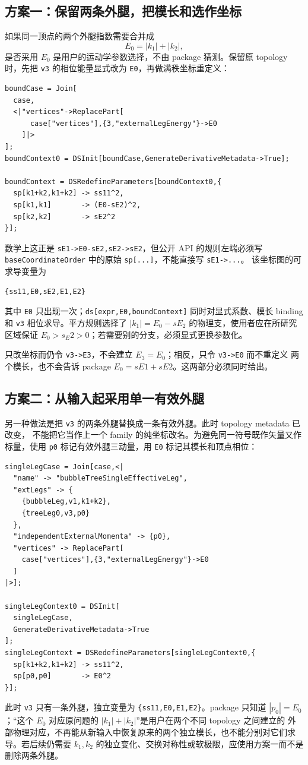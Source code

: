 ﻿\documentclass[a4paper,11pt]{article}
\begin{document}
\subsection{方案一：保留两条外腿，把模长和选作坐标}

如果同一顶点的两个外腿指数需要合并成
\begin{equation}
 E_0=|k_1|+|k_2|,
\end{equation}
是否采用 $E_0$ 是用户的运动学参数选择，不由 package 猜测。保留原 topology 时，先把
\texttt{v3} 的相位能量显式改为 \texttt{E0}，再做满秩坐标重定义：
\begin{verbatim}
boundCase = Join[
  case,
  <|"vertices"->ReplacePart[
      case["vertices"],{3,"externalLegEnergy"}->E0
    ]|>
];
boundContext0 = DSInit[boundCase,GenerateDerivativeMetadata->True];

boundContext = DSRedefineParameters[boundContext0,{
  sp[k1+k2,k1+k2] -> ss11^2,
  sp[k1,k1]       -> (E0-sE2)^2,
  sp[k2,k2]       -> sE2^2
}];
\end{verbatim}
数学上这正是 \texttt{sE1->E0-sE2,sE2->sE2}，但公开 API 的规则左端必须写
\texttt{baseCoordinateOrder} 中的原始 \texttt{sp[...]}，不能直接写 \texttt{sE1->...}。
该坐标图的可求导变量为
\begin{verbatim}
{ss11,E0,sE2,E1,E2}
\end{verbatim}
其中 \texttt{E0} 只出现一次；\texttt{ds[expr,E0,boundContext]} 同时对显式系数、模长 binding
和 \texttt{v3} 相位求导。平方规则选择了 $|k_1|=E_0-sE_2$ 的物理支，使用者应在所研究区域保证
$E_0>s_E2>0$；若需要别的分支，必须显式更换参数化。

只改坐标而仍令 \texttt{v3->E3}，不会建立 $E_3=E_0$；相反，只令 \texttt{v3->E0} 而不重定义
两个模长，也不会告诉 package $E_0=sE1+sE2$。这两部分必须同时给出。

\subsection{方案二：从输入起采用单一有效外腿}

另一种做法是把 \texttt{v3} 的两条外腿替换成一条有效外腿。此时 topology metadata 已改变，
不能把它当作上一个 family 的纯坐标改名。为避免同一符号既作矢量又作标量，使用 \texttt{p0}
标记有效外腿三动量，用 \texttt{E0} 标记其模长和顶点相位：
\begin{verbatim}
singleLegCase = Join[case,<|
  "name" -> "bubbleTreeSingleEffectiveLeg",
  "extLegs" -> {
    {bubbleLeg,v1,k1+k2},
    {treeLeg0,v3,p0}
  },
  "independentExternalMomenta" -> {p0},
  "vertices" -> ReplacePart[
    case["vertices"],{3,"externalLegEnergy"}->E0
  ]
|>];

singleLegContext0 = DSInit[
  singleLegCase,
  GenerateDerivativeMetadata->True
];
singleLegContext = DSRedefineParameters[singleLegContext0,{
  sp[k1+k2,k1+k2] -> ss11^2,
  sp[p0,p0]       -> E0^2
}];
\end{verbatim}
此时 \texttt{v3} 只有一条外腿，独立变量为 \texttt{\{ss11,E0,E1,E2\}}。package 只知道
$|p_0|=E_0$；“这个 $E_0$ 对应原问题的 $|k_1|+|k_2|$”是用户在两个不同 topology 之间建立的
外部物理对应，不再能从新输入中恢复原来的两个独立模长，也不能分别对它们求导。若后续仍需要
$k_1,k_2$ 的独立变化、交换对称性或软极限，应使用方案一而不是删除两条外腿。
\end{document}
